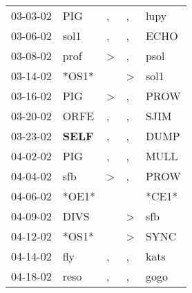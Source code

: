 \begin{supertabular}{p{0.07\textwidth}p{0.06\textwidth}p{0.02\textwidth}p{0.02\textwidth}p{0.06\textwidth}}
          03-03-02\textsuperscript{} &            PIG\textsuperscript{} &                , &                , &           lupy\textsuperscript{} \\
          03-06-02\textsuperscript{} &           sol1\textsuperscript{} &                , &                , &           ECHO\textsuperscript{} \\
          03-08-02\textsuperscript{} &           prof\textsuperscript{} &     \textgreater &                , &           psol\textsuperscript{} \\
          03-14-02\textsuperscript{} &                            *OS1* &                  &     \textgreater &           sol1\textsuperscript{} \\
          03-16-02\textsuperscript{} &            PIG\textsuperscript{} &     \textgreater &                , &           PROW\textsuperscript{} \\
          03-20-02\textsuperscript{} &           ORFE\textsuperscript{} &                , &                , &           SJIM\textsuperscript{} \\
          03-23-02\textsuperscript{} &  \textbf{SELF\textsuperscript{}} &                , &                , &           DUMP\textsuperscript{} \\
          04-02-02\textsuperscript{} &            PIG\textsuperscript{} &                , &                , &           MULL\textsuperscript{} \\
          04-04-02\textsuperscript{} &            sfb\textsuperscript{} &     \textgreater &                , &           PROW\textsuperscript{} \\
          04-06-02\textsuperscript{} &                            *OE1* &                  &                  &                            *CE1* \\
          04-09-02\textsuperscript{} &           DIVS\textsuperscript{} &                  &     \textgreater &            sfb\textsuperscript{} \\
          04-12-02\textsuperscript{} &                            *OS1* &                  &     \textgreater &           SYNC\textsuperscript{} \\
          04-14-02\textsuperscript{} &            fly\textsuperscript{} &                , &                , &           kats\textsuperscript{} \\
          04-18-02\textsuperscript{} &           reso\textsuperscript{} &                , &                , &           gogo\textsuperscript{} \\

\end{supertabular}
